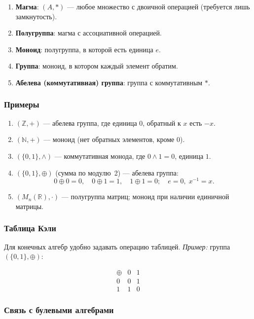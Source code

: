 \begin{enumerate}[label=\arabic*)]
  \item \textbf{Магма}: $(A,*)$ — любое множество с двоичной операцией (требуется лишь замкнутость).
  \item \textbf{Полугруппа}: магма с ассоциативной операцией.
  \item \textbf{Моноид}: полугруппа, в которой есть единица $e$.
  \item \textbf{Группа}: моноид, в котором каждый элемент обратим.
  \item \textbf{Абелева (коммутативная) группа}: группа с коммутативным $*$.
\end{enumerate}

\subsubsection{Примеры}

\begin{enumerate}[label=\arabic*)]
  \item $(\mathbb{Z}, +)$ — абелева группа, где единица $0$, обратный к $x$ есть $-x$.
  \item $(\mathbb{N}, +)$ — моноид (нет обратных элементов, кроме $0$).
  \item $(\{0,1\}, \wedge)$ — коммутативная монода, где $0\wedge1=0$, единица $1$.
  \item $(\{0,1\}, \oplus)$ (сумма по модулю 2) — абелева группа:  
    \[
      0\oplus0=0,\quad 0\oplus1=1,\quad1\oplus1=0;
      \quad e=0,\;x^{-1}=x.
    \]
  \item $(M_n(\mathbb{R}), \cdot)$ — полугруппа матриц; моноид при наличии единичной матрицы.
\end{enumerate}

\subsubsection{Таблица Кэли}

Для конечных алгебр удобно задавать операцию таблицей.  
\emph{Пример:} группа $(\{0,1\},\oplus)$:

\[
\begin{array}{c|cc}
\oplus & 0 & 1 \\ \hline
0 & 0 & 1 \\
1 & 1 & 0
\end{array}
\]

\subsubsection{Связь с булевыми алгебрами}

